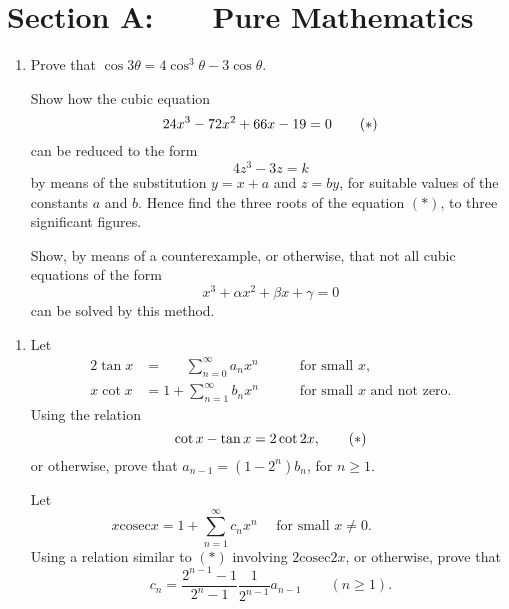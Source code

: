\documentclass[a4, 11pt]{report}
\newlength{\qspace}
\newcounter{qnumber}
\newenvironment{question}%
 {\vspace{\qspace}
  \begin{enumerate}[\bfseries 1\quad][10]%
    \setcounter{enumi}{\value{qnumber}}%
    \item%
 }
{
  \end{enumerate}
  \filbreak
  \stepcounter{qnumber}
 }
\begin{document}
\setcounter{page}{2}

 
\section*{Section A: \ \ \ Pure Mathematics}

\begin{question}
Prove that $\cos3\theta=4\cos^{3}\theta-3\cos\theta$. 


Show how the cubic equation 
\[
24x^{3}-72x^{2}+66x-19=0\tag{\ensuremath{*}}
\]
can be reduced to the form 
\[
4z^{3}-3z=k
\]
by means of the substitution $y=x+a$ and $z=by$, for suitable values
of the constants $a$ and $b$. Hence find the three roots of the
equation $(*)$, to three significant figures.


Show, by means of a counterexample, or otherwise, that not all cubic
equations of the form 
\[
x^{3}+\alpha x^{2}+\beta x+\gamma=0
\]
can be solved by this method.
\end{question}

\begin{question}
Let 
\begin{alignat*}{2}
\tan x & =\ \ \, \quad{\displaystyle \sum_{n=0}^{\infty}a_{n}x^{n}} &  & \text{ for small }x,\\
x\cot x & =1+\sum_{n=1}^{\infty}b_{n}x^{n}\quad &  & \text{ for small }x\text{ and not zero}.
\end{alignat*}
Using the relation 
\[
\cot x-\tan x=2\cot2x,\tag{\ensuremath{*}}
\]
 or otherwise, prove that $a_{n-1}=(1-2^{n})b_{n}$, for $n\geqslant1$. 


Let 
\[
x\mathrm{cosec}x=1+{\displaystyle \sum_{n=1}^{\infty}c_{n}x^{n}\quad\text{ for small }x\neq0. \qquad \qquad \, }
\]
Using a relation similar to $(*)$ involving $2\mathrm{cosec}2x$, or
otherwise, prove that 
\[
c_{n}=\frac{2^{n-1}-1}{2^{n}-1}\frac{1}{2^{n-1}}a_{n-1}\qquad(n\geqslant1).
\]
\end{question}
\end{document}
